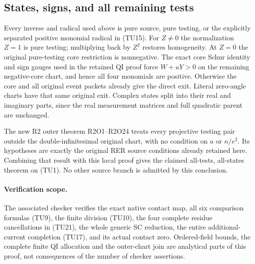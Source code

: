 \subsection{States, signs, and all remaining tests}

Every inverse and radical used above is pure source, pure testing,
or the explicitly separated positive monomial radical in (TU15).
For $Z\ne0$ the normalization $Z=1$ is pure testing; multiplying
back by $Z^2$ restores homogeneity.  At $Z=0$ the original
pure-testing core restriction is nonnegative.  The exact core
Schur identity and sign gauges used in the retained QI proof
force $W+uY>0$ on the remaining negative-core chart, and hence
all four monomials are positive.  Otherwise the core and all
original event packets already give the direct exit.  Literal
zero-angle charts have that same original exit.  Complex states
split into their real and imaginary parts, since the real
measurement matrices and full quadratic parent are unchanged.

The new R2 outer theorem R2O1--R2O24 treats every projective
testing pair outside the double-infinitesimal original chart,
with no condition on $a$ or $n/e^2$.  Its hypotheses are exactly
the original RER source conditions already retained here.
Combining that result with this local proof gives the claimed
all-tests, all-states theorem on (TU1).  No other source branch
is admitted by this conclusion.

\paragraph{Verification scope.}
The associated checker verifies the exact native contact map,
all six comparison formulas (TU9), the finite division (TU10),
the four complete residue cancellations in (TU21),
the whole generic SC reduction, the entire additional-current
completion (TU17), and its actual contact zero.  Ordered-field
bounds, the complete finite QI allocation and the outer-chart
join are analytical parts of this proof, not consequences of
the number of checker assertions.
